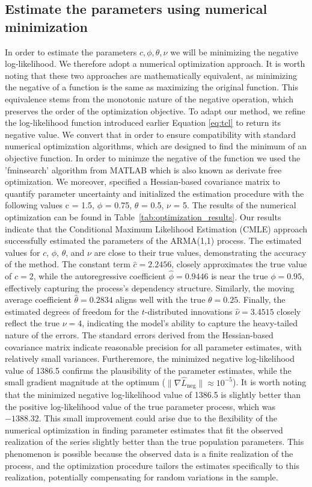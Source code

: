 \documentclass[12pt]{article}
\begin{document}
\subsection{Estimate the parameters using numerical minimization}
In order to estimate the parameters $c, \phi, \theta,\nu$ we will be minimizing the negative log-likelihood. We therefore adopt a numerical optimization approach. It is worth noting that these two approaches are mathematically equivalent, as minimizing the negative of a function is the same as maximizing the original function. This equivalence stems from the monotonic nature of the negative operation, which preserves the order of the optimization objective.
To adapt our method, we refine the log-likelihood function introduced earlier Equation \eqref{eq:tcl} to return its negative value.
We convert that in order to ensure compatibility with standard numerical optimization algorithms, which are designed to find the minimum of an objective function.
In order to minimze the negative of the function we used the 'fminsearch' algorithm from MATLAB which is also known as derivate free optimization. 
We moreover, specified a Hessian-based covariance matrix to quantify parameter uncertainty and initialized the estimation procedure with the following values c = 1.5, $\phi$ = 0.75, $\theta$ = 0.5, $\nu$ = 5.
The results of the numerical optimization can be found in Table~\ref{tab:optimization_results}. Our results indicate that the Conditional Maximum Likelihood Estimation (CMLE) approach successfully estimated the parameters of the ARMA(1,1) process.
The estimated values for \(c\), \(\phi\), \(\theta\), and \(\nu\) are close to their true values, demonstrating the accuracy of the method.
The constant term  \(\hat{c} = 2.2456\), closely approximates the true value of \(c = 2\),  while the autoregressive coefficient  \(\hat{\phi} = 0.9446\) is near the true \(\phi = 0.95\), effectively capturing the process's dependency structure. Similarly, the moving average coefficient \(\hat{\theta} = 0.2834\) aligns well with the true \(\theta = 0.25\). Finally, the estimated degrees of freedom for the \(t\)-distributed innovations \(\hat{\nu} = 3.4515\) closely reflect the true \(\nu = 4\), indicating the model's ability to capture the heavy-tailed nature of the errors.
The standard errors derived from the Hessian-based covariance matrix indicate reasonable precision for all parameter estimates, with relatively small variances. Furtheremore, the minimized negative log-likelihood value of 1386.5 confirms the plausibility of the parameter estimates, while the small gradient magnitude at the optimum (\(\|\nabla \hat{L}_{\text{neg}}\| \approx 10^{-5}\)). It is worth noting that the minimized negative log-likelihood value of 1386.5 is slightly better than the positive log-likelihood value of the true parameter process, which was \(-1388.32\). This small improvement could arise due to the flexibility of the numerical optimization in finding parameter estimates that fit the observed realization of the series slightly better than the true population parameters. This phenomenon is possible because the observed data is a finite realization of the process, and the optimization procedure tailors the estimates specifically to this realization, potentially compensating for random variations in the sample.
\end{document}

